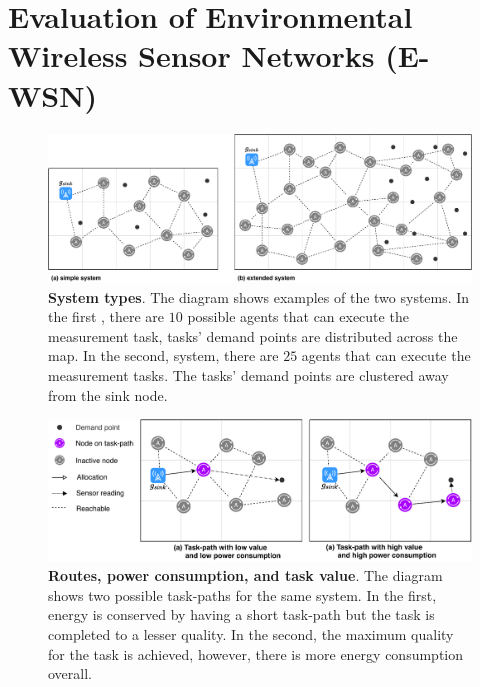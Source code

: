 \section{Evaluation of Environmental Wireless Sensor Networks (E-WSN)}
\label{section:experimental}	
\begin{figure}[ht]
	\centering
	\includegraphics[width=0.9\linewidth, trim={25pt 0pt 25pt 0pt, clip}]{system-types}
	\caption{\textbf{System types}. The diagram shows examples of the two systems. In the first \simulationSimple{}{}, there are $10$ possible agents that can execute the measurement task, tasks' demand points are distributed across the map. In the second, \simulationExtended{}{} system, there are $25$ agents that can execute the measurement tasks. The tasks' demand points are clustered away from the sink node.}
	\label{fig:system-types}
\end{figure}
\begin{figure}[ht]
	\centering
	\includegraphics[width=0.9\linewidth, trim={25pt 0pt 25pt 0pt, clip}]{route-types}
	\caption{\textbf{Routes, power consumption, and task value}. The diagram shows two possible task-paths for the same system. In the first, energy is conserved by having a short task-path but the task is completed to a lesser quality. In the second, the maximum quality for the task is achieved, however, there is more energy consumption overall.}
	\label{fig:route_types}
\end{figure}

